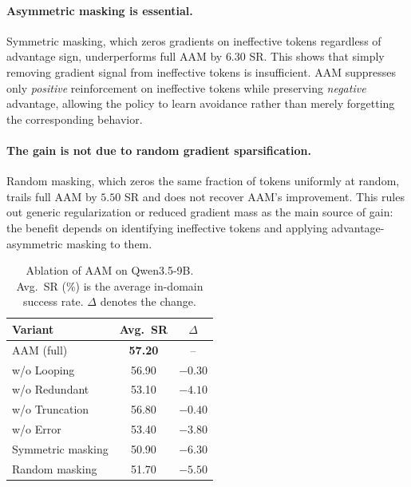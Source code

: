 \documentclass[letterpaper]{article} %
\begin{document}
\paragraph{Asymmetric masking is essential.}
Symmetric masking, which zeros gradients on ineffective tokens regardless of advantage sign, underperforms full AAM by $6.30$ SR.
This shows that simply removing gradient signal from ineffective tokens is insufficient.
AAM suppresses only \emph{positive} reinforcement on ineffective tokens while preserving \emph{negative} advantage, allowing the policy to learn avoidance rather than merely forgetting the corresponding behavior.

\paragraph{The gain is not due to random gradient sparsification.}
Random masking, which zeros the same fraction of tokens uniformly at random, trails full AAM by $5.50$ SR and does not recover AAM's improvement.
This rules out generic regularization or reduced gradient mass as the main source of gain: the benefit depends on identifying ineffective tokens and applying advantage-asymmetric masking to them.

\begin{table}[t]
    \centering
    \begin{tabular}{lcc}
        \toprule
        Variant & Avg.\ SR & $\Delta$ \\
        \midrule
        AAM (full)              & \textbf{57.20} & -- \\
        \midrule
        \quad w/o Looping       & 56.90 & $-0.30$ \\
        \quad w/o Redundant     & 53.10 & $-4.10$ \\
        \quad w/o Truncation    & 56.80 & $-0.40$ \\
        \quad w/o Error         & 53.40 & $-3.80$ \\
        \midrule
        Symmetric masking       & 50.90 & $-6.30$ \\
        Random masking          & 51.70 & $-5.50$ \\
        \bottomrule
    \end{tabular}
    \caption{
    Ablation of AAM on Qwen3.5-9B.
    Avg.\ SR (\%) is the average in-domain success rate.
    $\Delta$ denotes the change.
    }
    \vspace{-6pt}
    \label{tab:ablation}
\end{table}
\end{document}
